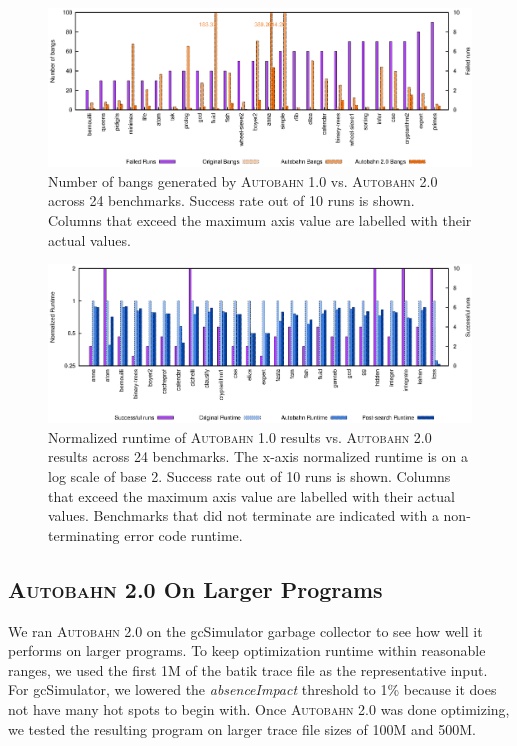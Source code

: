 \documentclass[format=sigplan, review=true]{acmart}
\newcommand{\hotspots}[0]{hot spots}
\newcommand{\Ao}[0]{\textsc{Autobahn 1.0}}
\newcommand{\At}[0]{\textsc{Autobahn 2.0}}
\newcommand{\absim}[0]{\textit{absenceImpact}}
\newcommand{\nonterm}[0]{non-terminating}
\begin{document}
\begin{figure}
\includegraphics[width=\textwidth]{pap1-bangs}
\caption{Number of bangs generated by \Ao{} vs. \At{} across 24 benchmarks. Success rate out of 10 runs is shown. Columns that exceed the maximum axis value are labelled with their actual values.}
\end{figure}

\begin{figure}
\includegraphics[width=\textwidth]{pap1}
\caption{Normalized runtime of \Ao{} results vs. \At{} results across 24 benchmarks. The x-axis normalized runtime is on a log scale of base 2. Success rate out of 10 runs is shown. Columns that exceed the maximum axis value are labelled with their actual values. Benchmarks that did not terminate are indicated with a \nonterm{} error code runtime.}
\end{figure}

\subsection{\At{} On Larger Programs}

We ran \At{} on the gcSimulator garbage collector to see how well it performs on larger programs. To keep optimization runtime within reasonable ranges, we used the first 1M of the batik trace file as the representative input. For gcSimulator, we lowered the \absim{} threshold to 1\% because it does not have many \hotspots{} to begin with. Once \At{} was done optimizing, we tested the resulting program on larger trace file sizes of 100M and 500M. 
\end{document}
